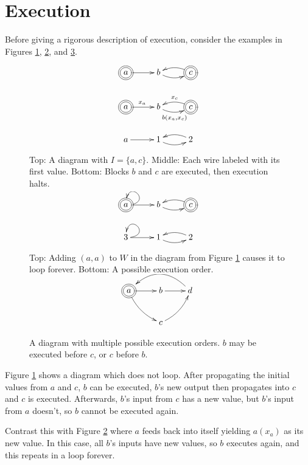 \documentclass[twocolumn]{article}
\begin{document}
\section{Execution}\label{sec:execution}

Before giving a rigorous description of execution, consider the examples in Figures \ref{fig:noloop}, \ref{fig:noloop2loop}, and \ref{fig:multi-order}.

\begin{figure}[h]
\[
\xymatrix{
    *++[o][F=]{a} \ar[r] & b \ar@/_/[r] & *++[o][F=]{c} \ar@/_/[l] \\
    *++[o][F=]{a} \ar[r]^{x_a} & b \ar@/_/[r]_{b(x_a, x_c)} & *++[o][F=]{c} \ar@/_/[l]_{x_c} \\
    a \ar[r] & 1 \ar@/_/[r] & 2 \ar@/_/[l] \\
}
\]
    \caption{Top: A diagram with $I=\{a, c\}$. Middle: Each wire labeled with its first value. Bottom: Blocks $b$ and $c$ are executed, then execution halts.}
    \label{fig:noloop}
\end{figure}

\begin{figure}[h]
\[
\xymatrix{
    *++[o][F=]{a} \ar[r] \ar@(r, u)[] & b \ar@/_/[r] & *++[o][F=]{c} \ar@/_/[l] \\
    3 \ar[r] \ar@(r, u)[] & 1 \ar@/_/[r] & 2 \ar@/_/[l] \\
}
\]
    \caption{Top: Adding $(a, a)$ to $W$ in the diagram from Figure \ref{fig:noloop} causes it to loop forever. Bottom: A possible execution order.}
    \label{fig:noloop2loop}
\end{figure}

\begin{figure}[h]
\vspace{1em}
\[
\xymatrix{
    *++[o][F=]{a} \ar[r]\ar@/_/[dr] & b \ar[r] & d \ar@/_2em/[ll] \\
    & c \ar@/_/[ur]
}
\]
    \caption{A diagram with multiple possible execution orders. $b$ may be executed before $c$, or $c$ before $b$.}
    \label{fig:multi-order}
\end{figure}

Figure \ref{fig:noloop} shows a diagram which does not loop. After propagating the initial values from $a$ and $c$, $b$ can be executed, $b$'s new output then propagates into $c$ and $c$ is executed. Afterwards, $b$'s input from $c$ has a new value, but $b$'s input from $a$ doesn't, so $b$ cannot be executed again.

Contrast this with Figure \ref{fig:noloop2loop} where $a$ feeds back into itself yielding $a(x_a)$ as its new value. In this case, all $b$'s inputs have new values, so $b$ executes again, and this repeats in a loop forever.
\end{document}
